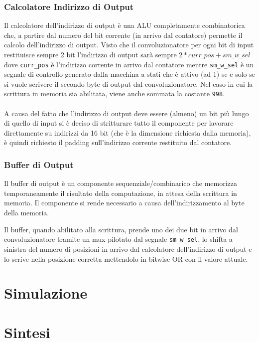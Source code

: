 \documentclass[12pt, a4paper]{article}
\begin{document}
\subsubsection{Calcolatore Indirizzo di Output}

Il calcolatore dell'indirizzo di output è una ALU completamente combinatorica che, a partire
dal numero del bit corrente (in arrivo dal contatore) permette il calcolo dell'indirizzo di output.
Visto che il convoluzionatore per ogni bit di input restituisce sempre 2 bit l'indirizzo di output
sarà sempre $2 * curr\_pos + sm\_w\_sel$ dove \texttt{curr\_pos} è l'indirizzo corrente in arrivo dal
contatore mentre \texttt{sm\_w\_sel} è un segnale di controllo generato dalla macchina a stati che è attivo
(ad 1) se e solo se si vuole scrivere il secondo byte di output dal convoluzionatore.
Nel caso in cui la scrittura in memoria sia abilitata, viene anche sommata la costante \texttt{998}.
\\
\\
A causa del fatto che l'indirizzo di output deve essere (almeno) un bit più lungo di quello
di input si è deciso di stritturare tutto il componente per lavorare direttamente su indirizzi da 16 bit 
(che è la dimensione richiesta dalla memoria), è quindi richiesto il padding sull'indirizzo corrente
restituito dal contatore.


\subsubsection{Buffer di Output}

Il buffer di output è un componente sequenziale/combinarico che memorizza temporaneamente il risultato della
computazione, in attesa della scrittura in memoria. 
Il componente si rende necessario a causa dell'indirizzamento al byte della memoria.

Il buffer, quando abilitato alla scrittura, prende uno dei due bit in arrivo dal convoluzionatore tramite un mux 
pilotato dal segnale \texttt{sm\_w\_sel}, lo shifta a sinistra del numero di posizioni in arrivo
dal calcolatore dell'indirizzo di output e lo scrive nella posizione corretta 
mettendolo in bitwise OR con il valore attuale.
\pagebreak
\section{Simulazione}

\section{Sintesi}
\end{document}
